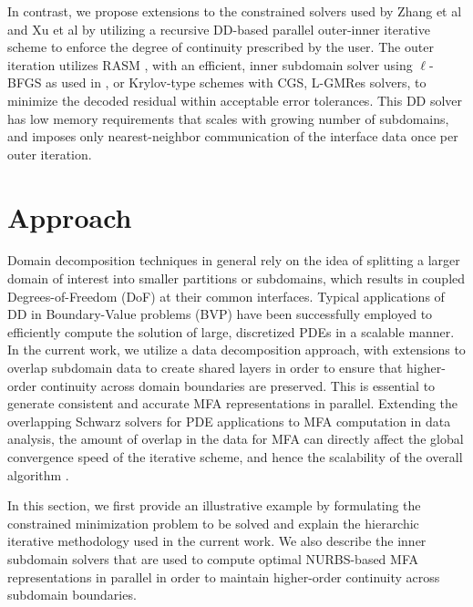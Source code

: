 \documentclass[conference]{IEEEtran}
\begin{document}
In contrast, we propose extensions to the constrained solvers used by Zhang et al \cite{zhang-nurbs-continuity} and Xu et al \cite{xu-jahn-discrete-adjoint} by utilizing a recursive DD-based parallel outer-inner iterative scheme to enforce the degree of continuity prescribed by the user. The outer iteration utilizes RASM \cite{gander-rasm}, with an efficient, inner subdomain solver using $\ell$-BFGS as used in \cite{zheng-bo-bspline-bfgs}, or Krylov-type schemes with CGS, L-GMRes solvers, to minimize the decoded residual within acceptable error tolerances. This DD solver has low memory requirements that scales with growing number of subdomains, and imposes only nearest-neighbor communication of the interface data once per outer iteration. 

\section{Approach}

Domain decomposition techniques in general rely on the idea of splitting a larger domain of interest into smaller partitions or subdomains, which results in coupled Degrees-of-Freedom (DoF) at their common interfaces. Typical applications of DD in Boundary-Value problems (BVP) \cite{smith-ddm, lions-asm} have been successfully employed to efficiently compute the solution of large, discretized PDEs in a scalable manner. In the current work, we utilize a data decomposition approach, with extensions to overlap subdomain data to create shared layers in order to ensure that higher-order continuity across domain boundaries are preserved. This is essential to generate consistent and accurate MFA representations in parallel. Extending the overlapping Schwarz solvers for PDE applications to MFA computation in data analysis, the amount of overlap in the data for MFA can directly affect the global convergence speed of the iterative scheme, and hence the scalability of the overall algorithm \cite{bjorstad-overlap-1989}. %

In this section, we first provide an illustrative example by formulating the constrained minimization problem to be solved and explain the hierarchic iterative methodology used in the current work. We also describe the inner subdomain solvers that are used to compute optimal NURBS-based MFA representations in parallel in order to maintain higher-order continuity across subdomain boundaries.
\end{document}
